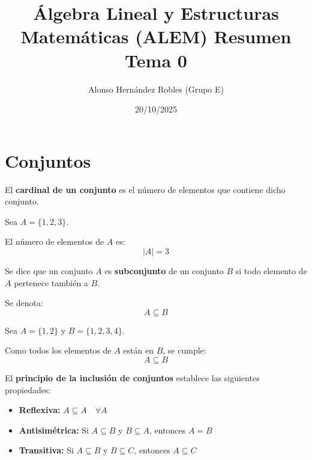\documentclass[a4paper,12pt]{article}
\title{Álgebra Lineal y Estructuras Matemáticas (ALEM) Resumen Tema 0}
\author{Alonso Hernández Robles (Grupo E)}
\date{20/10/2025}
\begin{document}
\maketitle

\tableofcontents
\newpage

\section{Conjuntos}

\begin{procedimiento}[title=Cardinal de un conjunto]
El \textbf{cardinal de un conjunto} es el número de elementos que contiene dicho conjunto.
\end{procedimiento}

\begin{ejemplo}[title=Ejemplo: Cardinal de un conjunto]
Sea $A = \{1, 2, 3\}$.  

El número de elementos de $A$ es:
\[
|A| = 3
\]
\end{ejemplo}

\begin{procedimiento}[title=Subconjunto de un conjunto]
Se dice que un conjunto $A$ es \textbf{subconjunto} de un conjunto $B$ si todo elemento de $A$ pertenece también a $B$.  

Se denota:
\[
A \subseteq B
\]
\end{procedimiento}

\begin{ejemplo}[title=Ejemplo: Subconjunto]
Sea $A = \{1, 2\}$ y $B = \{1, 2, 3, 4\}$.  

Como todos los elementos de $A$ están en $B$, se cumple:
\[
A \subseteq B
\]
\end{ejemplo}

\begin{procedimiento}[title=Propiedades de la inclusión de conjuntos]
El \textbf{principio de la inclusión de conjuntos} establece las siguientes propiedades:

\begin{itemize}
    \item \textbf{Reflexiva:} \quad $A \subseteq A \quad \forall A$
    \item \textbf{Antisimétrica:} \quad Si $A \subseteq B$ y $B \subseteq A$, entonces $A = B$
    \item \textbf{Transitiva:} \quad Si $A \subseteq B$ y $B \subseteq C$, entonces $A \subseteq C$
\end{itemize}
\end{procedimiento}
\end{document}
